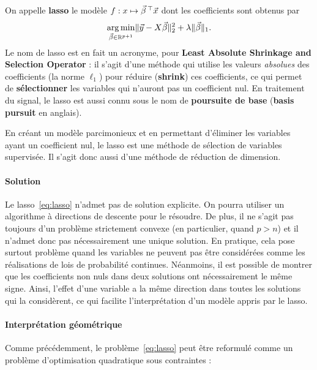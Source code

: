 On appelle \textbf{lasso} le modèle $f: x \mapsto \bbeta^\top \xx$ dont les
coefficients sont obtenus par
\begin{equation}
  \label{eq:lasso}
  \argmin_{\bbeta \in \RR^{p+1}} \ltwonorm{\yy - X \bbeta}^2 + 
  \lambda \lonenorm{\bbeta}.
\end{equation}    
Le nom de lasso est en fait un acronyme, pour \textbf{Least Absolute Shrinkage and
  Selection Operator} : il s'agit d'une méthode qui utilise les valeurs {\it
  absolues} des coefficients (la norme $\ell_1$) pour réduire (\textbf{shrink})
ces coefficients, ce qui permet de \textbf{sélectionner} les variables qui
n'auront pas un coefficient nul. En traitement du signal, le lasso est aussi
connu sous le nom de \textbf{poursuite de base} (\textbf{basis pursuit} en anglais).

En créant un modèle parcimonieux et en permettant d'éliminer les variables
ayant un coefficient nul, le lasso est une méthode de sélection de variables
supervisée. Il s'agit donc aussi d'une méthode de réduction de dimension.

\paragraph{Solution}
Le lasso~\ref{eq:lasso} n'admet pas de solution explicite. On pourra utiliser
un algorithme à directions de descente  pour le résoudre. De plus, il ne s'agit pas
toujours d'un problème strictement convexe (en particulier, quand $p > n$) et
il n'admet donc pas nécessairement une unique solution. En pratique, cela pose
surtout problème quand les variables ne peuvent pas être considérées comme les
réalisations de lois de probabilité continues.
Néanmoins, %
il est possible de montrer que les coefficients non nuls dans deux solutions
ont nécessairement le même signe. Ainsi, l'effet d'une variable a la même
direction dans toutes les solutions qui la considèrent, ce qui facilite
l'interprétation d'un modèle appris par le lasso.
  
\paragraph{Interprétation géométrique}
Comme précédemment, le problème~\ref{eq:lasso} peut être reformulé comme un
problème d'optimisation quadratique sous contraintes :

